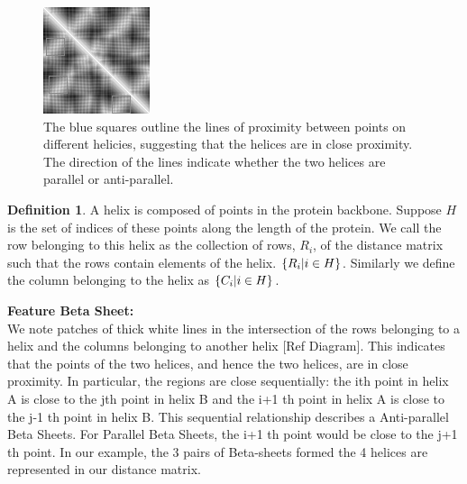 \documentclass[12pt, a4paper, twocolumn, fullpage]{article}
\theoremstyle{plain}
\theoremstyle{definition}
\newtheorem{defn}{Definition}[section]
\theoremstyle{remark}
\begin{document}
    
\begin{figure}[h]
    \centering
    \includegraphics[width=\linewidth]{1ux8matBetaSheets}
    \caption{The blue squares outline the lines of proximity between points on different helicies, suggesting that the helices are in close proximity. The direction of the lines indicate whether the two helices are parallel or anti-parallel.}
    \label{1ux8matBetaSheets}
\end{figure}

\begin{defn}
A helix is composed of points in the protein backbone. Suppose $H$ is the set of indices of these points along the length of the protein. We call the row belonging to this helix as the collection of rows, $R_{i}$, of the distance matrix such that the rows contain elements of the helix. $\{R_{i} \space | \space i \in H \}$. Similarly we define the column belonging to the helix as $\{C_{i} \space | \space i \in H \}$.
\end{defn}

\noindent
\textbf{Feature Beta Sheet:}\\
We note patches of thick white lines in the intersection of the rows belonging to a helix and the columns belonging to another helix [Ref Diagram]. This indicates that the points of the two helices, and hence the two helices, are in close proximity. In particular, the regions are close sequentially: the ith point in helix A is close to the jth point in helix B and the i+1 th point in helix A is close to the j-1 th point in helix B. This sequential relationship describes a Anti-parallel Beta Sheets. For Parallel Beta Sheets, the i+1 th point would be close to the j+1 th point. In our example, the 3 pairs of Beta-sheets formed the 4 helices are represented in our distance matrix.
\end{document}
